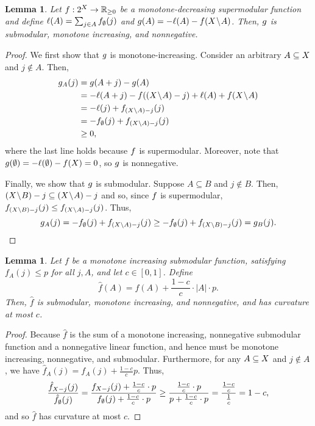 \documentclass{article}
\newcommand{\reals}{\ensuremath{\mathbb{R}}}
\newcommand{\posreals}{\ensuremath{\reals_{\ge 0}}}
\newtheorem{lemma}[theorem]{Lemma}
\theoremstyle{definition}
\begin{document}
\begin{lemma}
\label{lem:supmod-app}
Let $\obj : 2^{\ground} \to \posreals$ be a monotone-decreasing supermodular function and define $\ell(A) = \sum_{j \in A}f_{\emptyset}(j)$ and $g(A) = -\ell(A) - f(X\!\setminus\!A)$.    Then, $g$ is submodular, monotone increasing, and nonnegative.
\end{lemma}
\begin{proof}
We first show that $g$ is monotone-increasing.  Consider an arbitrary $A \subseteq X$ and $j \not\in A$.  Then,
\begin{align*}
g_{A}(j) &= g(A + j) - g(A) \\
&=  -\ell(A + j)  - f((X\!\setminus\!A) - j) + \ell(A) + f(X\!\setminus\!A) \\
&= -\ell(j) + f_{(X \setminus A) - j}(j) \\
&= -f_{\emptyset}(j) + f_{(X \setminus A) - j}(j)\\
&\ge 0,
\end{align*}
where the last line holds because $f$ is supermodular.  Moreover, note that $g(\emptyset) = -\ell(\emptyset) - f(X) = 0$, so $g$ is nonnegative.  

Finally, we show that $g$ is submodular.  Suppose $A \subseteq B$ and $j \not\in B$.  Then, $(X \!\setminus\! B) - j \subseteq (X \!\setminus\! A) - j$ and so, since $f$ is supermodular, $f_{(X \setminus B) - j}(j) \le f_{(X \setminus A) - j}(j)$.  Thus,
\begin{equation*}
g_{A}(j) = -f_{\emptyset}(j) + f_{(X \setminus A) - j}(j) \\
\ge -f_{\emptyset}(j) + f_{(X \setminus B) - j}(j) = g_{B}(j).
\end{equation*}
\end{proof}

\begin{lemma}
\label{lem:submod-inapprox-curv}
Let $f$ be a monotone increasing submodular function, satisfying $f_{A}(j) \le p$ for all $j, A$, and let $c \in [0,1]$.  Define $$\hat{f}(A) = f(A) + \frac{1 - c}{c}\cdot|A|\cdot p.$$  Then, $\hat{f}$ is submodular, monotone increasing, and nonnegative, and has curvature at most $c$.
\end{lemma}
\begin{proof}
Because $\hat{f}$ is the sum of a monotone increasing, nonnegative submodular function and a nonnegative linear function, and hence must be monotone increasing, nonnegative, and submodular.  Furthermore, for any $A \subseteq X$ and $j \not\in A$, we have $\hat{f}_{A}(j) = f_{A}(j) + \frac{1 - c}{c}p$.  Thus,
\begin{equation*}
\frac{\hat{f}_{X - j}(j)}{\hat{f}_{\emptyset}(j)} = \frac{f_{X - j}(j) + \frac{1 - c}{c}\cdot p}{f_{\emptyset}(j) + \frac{1 - c}{c}\cdot p}
\ge \frac{\frac{1 - c}{c}\cdot p}{p + \frac{1 - c}{c}\cdot p} = \frac{\frac{1-c}{c}}{\frac{1}{c}} = 1 - c,
\end{equation*}
and so $\hat{f}$ has curvature at most $c$.
\end{proof}
\end{document}
